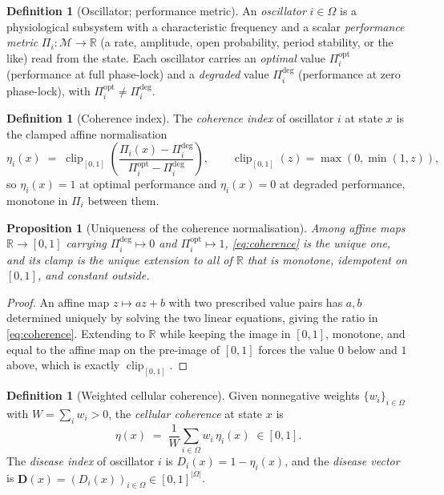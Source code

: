 \documentclass[11pt,a4paper]{article}
\theoremstyle{cfcthm}
\newtheorem{proposition}[theorem]{Proposition}
\theoremstyle{definition}
\newtheorem{definition}[theorem]{Definition}
\theoremstyle{remark}
\newcommand{\R}{\mathbb{R}}
\newcommand{\Man}{\mathcal{M}}          %
\newcommand{\st}{x}                     %
\newcommand{\ecoh}{\eta}                %
\newcommand{\dvec}{\mathbf{D}}          %
\newcommand{\Dom}{\Omega}               %
\newcommand{\set}[1]{\{#1\}}
\begin{document}
\begin{definition}[Oscillator; performance metric]
\label{def:oscillator}
An \emph{oscillator} $i\in\Dom$ is a physiological subsystem with a
characteristic frequency and a scalar \emph{performance metric}
$\Pi_i\colon\Man\to\R$ (a rate, amplitude, open probability, period stability,
or the like) read from the state. Each oscillator carries an \emph{optimal}
value $\Pi_i^{\mathrm{opt}}$ (performance at full phase-lock) and a
\emph{degraded} value $\Pi_i^{\mathrm{deg}}$ (performance at zero phase-lock),
with $\Pi_i^{\mathrm{opt}}\neq\Pi_i^{\mathrm{deg}}$.
\end{definition}

\begin{definition}[Coherence index]
\label{def:coherence-index}
The \emph{coherence index} of oscillator $i$ at state $\st$ is the clamped
affine normalisation
\begin{equation}
\ecoh_i(\st)\;=\;\operatorname{clip}_{[0,1]}\!
\left(\frac{\Pi_i(\st)-\Pi_i^{\mathrm{deg}}}
           {\Pi_i^{\mathrm{opt}}-\Pi_i^{\mathrm{deg}}}\right),
\qquad
\operatorname{clip}_{[0,1]}(z)=\max(0,\min(1,z)),
\label{eq:coherence}
\end{equation}
so $\ecoh_i(\st)=1$ at optimal performance and $\ecoh_i(\st)=0$ at degraded
performance, monotone in $\Pi_i$ between them.
\end{definition}

\begin{proposition}[Uniqueness of the coherence normalisation]
\label{prop:coherence-unique}
Among affine maps $\R\to[0,1]$ carrying $\Pi_i^{\mathrm{deg}}\mapsto0$ and
$\Pi_i^{\mathrm{opt}}\mapsto1$, \eqref{eq:coherence} is the unique one, and its
clamp is the unique extension to all of $\R$ that is monotone, idempotent on
$[0,1]$, and constant outside.
\end{proposition}

\begin{proof}
An affine map $z\mapsto az+b$ with two prescribed value pairs has $a,b$
determined uniquely by solving the two linear equations, giving the ratio in
\eqref{eq:coherence}. Extending to $\R$ while keeping the image in $[0,1]$,
monotone, and equal to the affine map on the pre-image of $[0,1]$ forces the
value $0$ below and $1$ above, which is exactly $\operatorname{clip}_{[0,1]}$.
\end{proof}

\begin{definition}[Weighted cellular coherence]
\label{def:cell-coherence}
Given nonnegative weights $\set{w_i}_{i\in\Dom}$ with $W=\sum_i w_i>0$, the
\emph{cellular coherence} at state $\st$ is
\begin{equation}
\ecoh(\st)\;=\;\frac{1}{W}\sum_{i\in\Dom} w_i\,\ecoh_i(\st)\;\in[0,1].
\label{eq:cell-coherence}
\end{equation}
The \emph{disease index} of oscillator $i$ is $D_i(\st)=1-\ecoh_i(\st)$, and
the \emph{disease vector} is $\dvec(\st)=(D_i(\st))_{i\in\Dom}\in[0,1]^{|\Dom|}$.
\end{definition}
\end{document}
